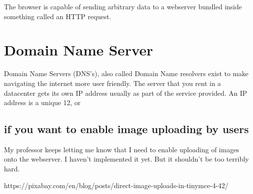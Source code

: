 The browser is capable of sending arbitrary data to a webserver bundled inside something called an HTTP request.

\section{Domain Name Server}

Domain Name Servers (DNS's), also called Domain Name resolvers exist to make navigating the internet more user friendly.  The server that you rent in a datacenter gets its own IP address usually as part of the service provided.  An IP address is a unique 12, or 

\subsection{if you want to enable image uploading by users}

My professor keeps letting me know that I need to enable uploading of images onto the webserver.  I haven't implemented it yet.  But it shouldn't be too terribly hard.

https://pixabay.com/en/blog/posts/direct-image-uploads-in-tinymce-4-42/




